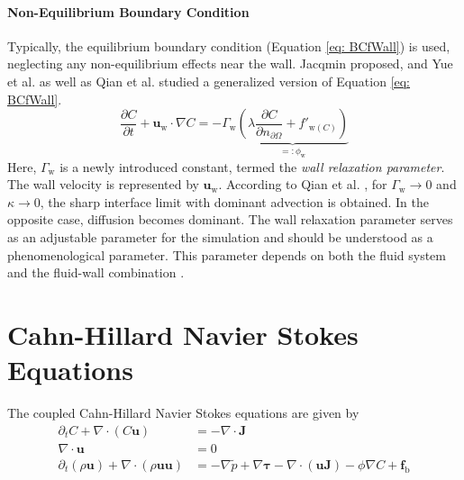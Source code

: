 \paragraph{Non-Equilibrium Boundary Condition}
\label{sec: nonEquiBC}
Typically, the equilibrium boundary condition (Equation \ref{eq: BCfWall}) is used, neglecting any non-equilibrium effects near the wall. Jacqmin \cite{jacqmin2000ContactlineDynamicsDiffuse} proposed, and Yue et al. \cite{yue2011WallEnergyRelaxation} as well as Qian et al. \cite{qian2006VariationalApproachMoving} studied a generalized version of Equation \ref{eq: BCfWall}.
\begin{equation}
    \frac{\partial C}{\partial t} + \mathbf{u}_{\mathrm{w}}\cdot \nabla C = -\Gamma_{\mathrm{w}} \underbrace{\left(\lambda \frac{\partial C}{\partial n_{\partial \Omega}}+f'_{\mathrm{w}(C)}\right)}_{=:\phi_{\mathrm{w}}}
\end{equation}
Here, $\Gamma_{\mathrm{w}}$ is a newly introduced constant, termed the \textit{wall relaxation parameter}. The wall velocity is represented by $\mathbf{u}_{\mathrm{w}}$. According to Qian et al. \cite{qian2006VariationalApproachMoving}, for $\Gamma_{\mathrm{w}}\rightarrow 0$ and $\kappa\rightarrow 0$, the sharp interface limit with dominant advection is obtained. In the opposite case, diffusion becomes dominant. The wall relaxation parameter serves as an adjustable parameter for the simulation and should be understood as a phenomenological parameter. This parameter depends on both the fluid system and the fluid-wall combination \cite{jacqmin2000ContactlineDynamicsDiffuse}.


\section{Cahn-Hillard Navier Stokes Equations}
The coupled Cahn-Hillard Navier Stokes equations are given by
\begin{align}
    \partial_t C + \nabla \cdot \left( C \mathbf{u} \right) &= -\nabla \cdot \mathbf{J} \\
    \nabla \cdot \mathbf{u} &= 0 \\
    \label{eq: NSEChanged}
    \partial_t(\rho \mathbf{u}) + \nabla \cdot (\rho \mathbf{u}\mathbf{u})&= -\nabla \tilde{p} + \nabla \mathbf{\tau} - \nabla \cdot(\mathbf{u}\mathbf{J})-\phi\nabla C + \mathbf{f}_{\mathrm{b}}
\end{align}

